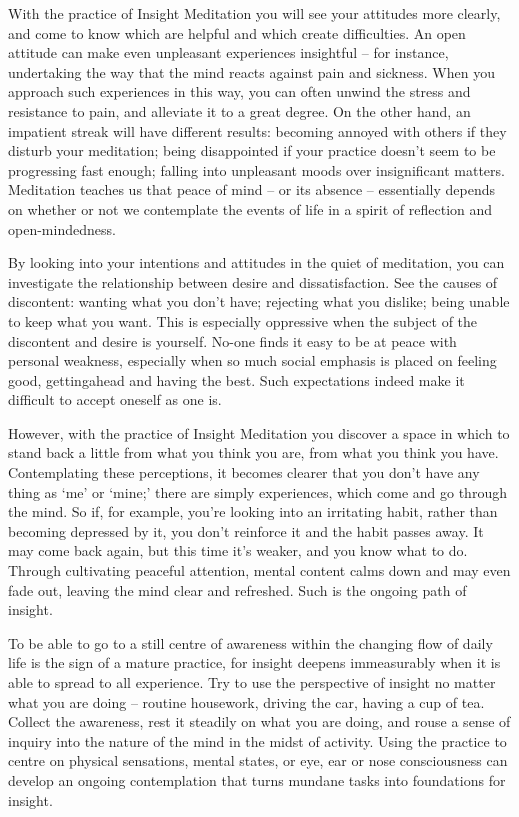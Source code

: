 
With the practice of Insight Meditation you will see your attitudes more
clearly, and come to know which are helpful and which create
difficulties. An open attitude can make even unpleasant experiences
insightful -- for instance, undertaking the way that the mind reacts
against pain and sickness. When you approach such experiences in this
way, you can often unwind the stress and resistance to pain, and
alleviate it to a great degree. On the other hand, an impatient streak
will have different results: becoming annoyed with others if they
disturb your meditation; being disappointed if your practice doesn't
seem to be progressing fast enough; falling into unpleasant moods over
insignificant matters. Meditation teaches us that peace of mind -- or
its absence -- essentially depends on whether or not we contemplate the
events of life in a spirit of reflection and open-mindedness.

By looking into your intentions and attitudes in the quiet of
meditation, you can investigate the relationship between desire and
dissatisfaction. See the causes of discontent: wanting what you don't
have; rejecting what you dislike; being unable to keep what you want.
This is especially oppressive when the subject of the discontent and
desire is yourself. No-one finds it easy to be at peace with personal
weakness, especially when so much social emphasis is placed on feeling
good, getting\linebreak ahead and having the best. Such expectations indeed make
it difficult to accept oneself as one is.

However, with the practice of Insight Meditation you discover a space in
which to stand back a little from what you think you are, from what you
think you have. Contemplating these perceptions, it becomes clearer that
you don't have any thing as `me' or `mine;' there are simply
experiences, which come and go through the mind. So if, for example,
you're looking into an irritating habit, rather than becoming depressed
by it, you don't reinforce it and the habit passes away. It may come
back again, but this time it's weaker, and you know what to do. Through
cultivating peaceful attention, mental content calms down and may even
fade out, leaving the mind clear and refreshed. Such is the ongoing path
of insight.

To be able to go to a still centre of awareness within the changing flow
of daily life is the sign of a mature practice, for insight deepens
immeasurably when it is able to spread to all experience. Try to use the
perspective of insight no matter what you are doing -- routine housework,
driving the car, having a cup of tea. Collect the awareness, rest it
steadily on what you are doing, and rouse a sense of inquiry into the
nature of the mind in the midst of activity. Using the practice to
centre on physical sensations, mental states, or eye, ear or nose
consciousness can develop an ongoing contemplation that turns mundane
tasks into foundations for insight.

